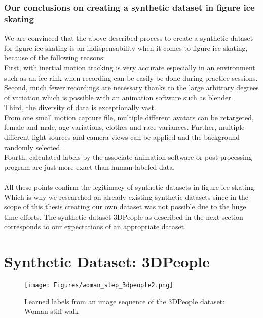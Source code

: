 \subsubsection*{Our conclusions on creating a synthetic dataset in figure ice skating}
We are convinced that the above-described process to create a synthetic dataset for figure ice skating is an
indispensability when it comes to figure ice skating,
because of the following reasons:\\
First, with inertial motion tracking is very accurate especially in an environment such as an ice rink when recording
can be easily be done during practice sessions.\\
Second, much fewer recordings are necessary thanks to the large arbitrary degrees of variation which is possible with
an animation software such as blender.\\
Third, the diversity of data is exceptionally vast.\\
From one small motion capture file, multiple different avatars can be retargeted, female and male, age variations,
clothes and race variances.
Further, multiple different light sources and camera views can be applied and the background randomly selected.\\
Fourth, calculated labels by the associate animation software or post-processing program are just more exact than
human labeled data.
\\\mbox{}\\
All these points confirm the legitimacy of synthetic datasets in figure ice skating.
Which is why we researched on already existing synthetic datasets since in the scope of this thesis creating our own
dataset was not possible due to the huge time efforts.
The synthetic dataset 3DPeople as described in the next section corresponds to our expectations of an appropriate dataset.




\section{Synthetic Dataset: 3DPeople}

\begin{figure}
    \centering
    \texttt{[image: Figures/woman\_step\_3dpeople2.png]}
    \decoRule
    \caption[3DPeople]{Learned labels from an image sequence of the 3DPeople dataset: Woman stiff walk}
    \label{fig:woman_step_3dpeople}
\end{figure}


